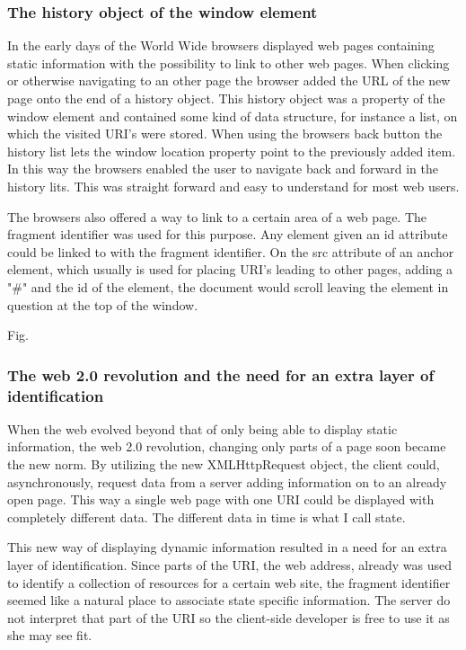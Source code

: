 \documentclass[english]{ifimaster}
\begin{document}
\subsubsection{The history object of the window element}
In the early days of the World Wide browsers displayed web pages containing static information with the possibility to link to other web pages. When clicking or otherwise navigating to an other page the browser added the URL of the new page onto the end of a history object. This history object was a property of the window element and contained some kind of data structure, for instance a list, on which the visited URI's were stored. When using the browsers back button the history list lets the window location property point to the previously added item. In this way the browsers enabled the user to navigate back and forward in the history lits. This was straight forward and easy to understand for most web users.

The browsers also offered a way to link to a certain area of a web page. The fragment identifier was used for this purpose. Any element given an id attribute could be linked to with the fragment identifier. On the src attribute of an anchor element, which usually is used for placing URI's leading to other pages, adding a "\#" and the id of the element, the document would scroll leaving the element in question at the top of the window.

Fig.

\subsubsection{The web 2.0 revolution and the need for an extra layer of identification}
When the web evolved beyond that of only being able to display static information, the web 2.0 revolution, changing only parts of a page soon became the new norm. By utilizing the new XMLHttpRequest object, the client could, asynchronously, request data from a server adding information on to an already open page. This way a single web page with one URI could be displayed with completely different data. The different data in time is what I call state.

This new way of displaying dynamic information resulted in a need for an extra layer of identification. Since parts of the URI, the web address, already was used to identify a collection of resources for a certain web site, the fragment identifier seemed like a natural place to associate state specific information. The server do not interpret that part of the URI so the client-side developer is free to use it as she may see fit. 
\end{document}
